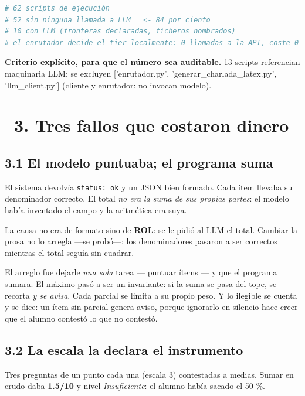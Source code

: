 \documentclass[11pt,a4paper]{article}
\newcommand{\iconotexto}[2]{\textcolor{cyanNeon}{\faIcon{#1}}~#2}
\begin{document}
\begin{lstlisting}[language=Python,caption={La frontera LLM, medida sobre el disco}]
# 62 scripts de ejecución
# 52 sin ninguna llamada a LLM   <- 84 por ciento
# 10 con LLM (fronteras declaradas, ficheros nombrados)
# el enrutador decide el tier localmente: 0 llamadas a la API, coste 0
\end{lstlisting}

\begin{cajaRecuerda}
\textbf{Criterio explícito, para que el número sea auditable.}
13 scripts referencian maquinaria LLM; se excluyen ['enrutador.py', 'generar\_charlada\_latex.py', 'llm\_client.py'] (cliente y enrutador: no invocan modelo).
\end{cajaRecuerda}

\section{\iconotexto{bug}{3. Tres fallos que costaron dinero}}

\subsection*{3.1 El modelo puntuaba; el programa suma}
El sistema devolvía \texttt{status: ok} y un JSON bien formado. Cada ítem
llevaba su denominador correcto. El total \emph{no era la suma de sus propias
partes}: el modelo había inventado el campo y la aritmética era suya.

La causa no era de formato sino de \textbf{ROL}: se le pidió al LLM el total.
Cambiar la prosa no lo arregla ---se probó---: los denominadores pasaron a ser
correctos mientras el total seguía sin cuadrar.

\begin{cajaEjemplo}
El arreglo fue dejarle \emph{una sola} tarea --- puntuar ítems --- y que el
programa sumara. El máximo pasó a ser un invariante: si la suma se pasa del tope,
se recorta \emph{y se avisa}. Cada parcial se limita a su propio peso. Y lo
ilegible se cuenta y se dice: un ítem sin parcial genera aviso, porque ignorarlo
en silencio hace creer que el alumno contestó lo que no contestó.
\end{cajaEjemplo}

\subsection*{3.2 La escala la declara el instrumento}
Tres preguntas de un punto cada una (escala 3) contestadas a medias. Sumar en
crudo daba \textbf{1.5/10} y nivel \emph{Insuficiente}: el alumno había
sacado el 50 \%.
\end{document}
